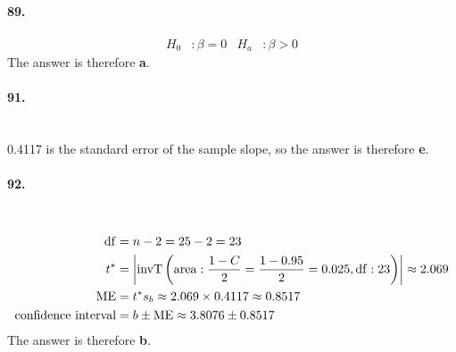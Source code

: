 \documentclass[../Homework]{subfiles}
\begin{document}
		\paragraph{89.}
			\begin{align*}
				H_0&: \beta = 0 & H_a&: \beta > 0
			\end{align*}
			The answer is therefore \textbf{a}.
		\paragraph{91.}\ \\
			0.4117 is the standard error of the sample slope, so the answer is therefore \textbf{e}.
		\paragraph{92.}\ \\
			\begin{align*}
				\operatorname{df} &= n - 2 = 25 - 2 = 23 \\
				t^* &= \left|\operatorname{invT}\left(\operatorname{area}: \frac{1 - C}{2} = \frac{1 - 0.95}{2} = 0.025, \operatorname{df}: 23\right)\right| \approx 2.069 \\
				\operatorname{ME} &= t^*s_b \approx 2.069 \times 0.4117 \approx 0.8517 \\
				\text{confidence interval} &= b \pm \operatorname{ME} \approx 3.8076 \pm 0.8517
			\end{align*}
			The answer is therefore \textbf{b}.
\end{document}

